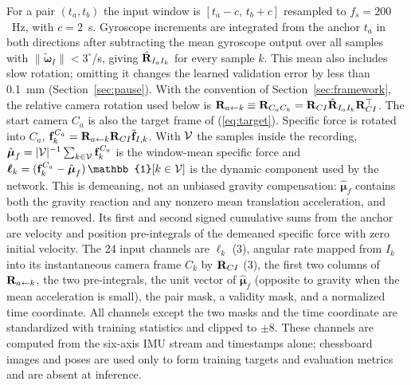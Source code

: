 For a pair $(t_a,t_b)$ the input window is $[t_a-c,\,t_b+c]$ resampled to
$f_s=200$~Hz, with $c=2$~s. Gyroscope increments are integrated from the
anchor $t_a$ in both directions after subtracting the mean gyroscope output over
all samples with $\|\tilde{\boldsymbol\omega}_I\|<3^\circ$/s, giving
$\hat{\bf R}_{I_aI_k}$ for every sample $k$. This mean also includes slow
rotation; omitting it changes the learned validation error by less than
0.1~mm (Section~\ref{sec:pause}). With the convention of
Section~\ref{sec:framework}, the relative camera rotation used below is
${\bf R}_{a\leftarrow k}\equiv{\bf R}_{C_aC_k}
={\bf R}_{CI}\hat{\bf R}_{I_aI_k}{\bf R}_{CI}^{\top}$. The start camera
$C_a$ is also the target frame of
(\ref{eq:target}). Specific force is rotated into $C_a$,
${\bf f}^{C_a}_k={\bf R}_{a\leftarrow k}{\bf R}_{CI}\tilde{\bf f}_{I,k}$.
With ${\cal V}$ the samples inside the recording,
$\hat{\boldsymbol\mu}_{f}=|{\cal V}|^{-1}\sum_{k\in{\cal V}}{\bf f}^{C_a}_k$ is the
window-mean specific force and
$\boldsymbol\ell_k=({\bf f}^{C_a}_k-\hat{\boldsymbol\mu}_{f})\,\mathbb{1}[k\in{\cal V}]$
is the dynamic component used by the network. This is demeaning, not an unbiased gravity compensation:
$\hat{\boldsymbol\mu}_{f}$ contains both the gravity reaction and any nonzero
mean translation acceleration, and both are removed. Its first and second
signed cumulative sums from the anchor are velocity and position pre-integrals
of the demeaned specific force with zero initial velocity. The 24 input
channels are
$\boldsymbol\ell_k$ (3), angular rate mapped from $I_k$ into its instantaneous
camera frame $C_k$ by ${\bf R}_{CI}$ (3), the first two columns of
${\bf R}_{a\leftarrow k}$, the two pre-integrals, the unit vector of
$\hat{\boldsymbol\mu}_{f}$ (opposite to gravity when the mean acceleration is
small), the pair mask, a validity mask, and a normalized time coordinate. All
channels except the two masks and the time coordinate are standardized with
training statistics and clipped to $\pm8$. These channels are computed from
the six-axis IMU stream and timestamps alone; chessboard images and poses are
used only to form training targets and evaluation metrics and are absent at
inference.


